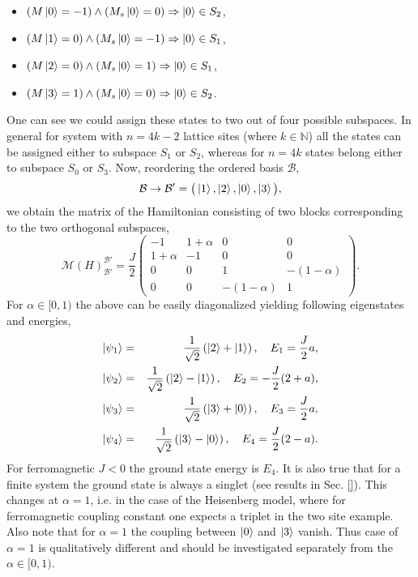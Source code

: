\documentclass[12pt, a4paper]{article}
\begin{document}
\begin{itemize}
	\item $(M\ket{0} = -1) \land (M_s\ket{0} = 0) \Rightarrow \ket{0} \in S_2$, 
	\item $(M\ket{1} = 0) \land (M_s\ket{0} = -1) \Rightarrow \ket{0} \in S_1$, 
	\item $(M\ket{2} = 0) \land (M_s\ket{0} = 1) \Rightarrow \ket{0} \in S_1$, 
	\item $(M\ket{3} = 1) \land (M_s\ket{0} = 0) \Rightarrow \ket{0} \in S_2$.
\end{itemize}
One can see we could assign these states to two out of four possible subspaces. In general for system with $n = 4k - 2$ lattice sites (where $k \in \mathbb{N}$) all the states can be assigned either to subspace $S_1$ or $S_2$, whereas for $n = 4k$ states belong either to subspace $S_0$ or $S_3$. Now, reordering the ordered basis $\mathcal{B}$,
\begin{equation}
\mathcal{B} \rightarrow \mathcal{B}' = \big(\ket{1}, \ket{2}, \ket{0}, \ket{3}\big),
\end{equation}
we obtain the matrix of the Hamiltonian consisting of two blocks corresponding to the two orthogonal subspaces,
\begin{equation}
\mathcal{M}(H)_{\mathcal{B}'}^{\mathcal{B}'} = \frac{J}{2} \begin{pmatrix}
-1 & 1+\alpha & 0 & 0 \\
1+\alpha & -1 & 0 & 0 \\
0 & 0 & 1 & -(1-\alpha) \\
0 & 0 & -(1-\alpha) & 1
\end{pmatrix}.
\end{equation}
For $\alpha \in [0, 1)$ the above can be easily diagonalized yielding following eigenstates and energies,
\begin{eqnarray}
\ket{\psi_1} &=& \frac{1}{\sqrt{2}}\left(\ket{2} + \ket{1}\right), \quad E_1 = \frac{J}{2}a, \\
\ket{\psi_2} &=& \frac{1}{\sqrt{2}}\left(\ket{2} - \ket{1}\right), \quad E_2 = -\frac{J}{2}(2+a), \\
\ket{\psi_3} &=& \frac{1}{\sqrt{2}}\left(\ket{3} + \ket{0}\right), \quad E_3 = \frac{J}{2}a, \\
\ket{\psi_4} &=& \frac{1}{\sqrt{2}}\left(\ket{3} - \ket{0}\right), \quad E_4 = \frac{J}{2}(2-a).
\end{eqnarray}
For ferromagnetic $J < 0$ the ground state energy is $E_4$. It is also true that for a finite system the ground state is always a singlet (see results in Sec. \ref{}). This changes at $\alpha = 1$, i.e. in the case of the Heisenberg model, where for ferromagnetic coupling constant one expects a triplet in the two site example. Also note that for $\alpha = 1$ the coupling between $\ket{0}$ and $\ket{3}$ vanish. Thus case of $\alpha = 1$ is qualitatively different and should be investigated separately from the $\alpha \in [0, 1)$. 
\end{document}
